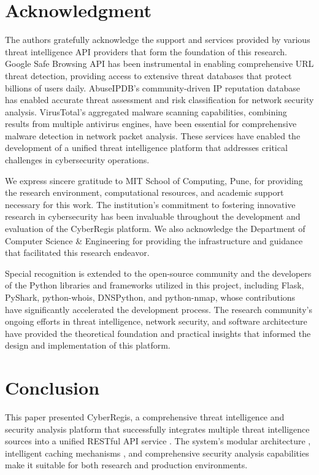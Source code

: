 \documentclass[conference]{IEEEtran}
\begin{document}
\section{Acknowledgment}

The authors gratefully acknowledge the support and services provided by various threat intelligence API providers that form the foundation of this research. Google Safe Browsing API has been instrumental in enabling comprehensive URL threat detection, providing access to extensive threat databases that protect billions of users daily. AbuseIPDB's community-driven IP reputation database has enabled accurate threat assessment and risk classification for network security analysis. VirusTotal's aggregated malware scanning capabilities, combining results from multiple antivirus engines, have been essential for comprehensive malware detection in network packet analysis. These services have enabled the development of a unified threat intelligence platform that addresses critical challenges in cybersecurity operations.

We express sincere gratitude to MIT School of Computing, Pune, for providing the research environment, computational resources, and academic support necessary for this work. The institution's commitment to fostering innovative research in cybersecurity has been invaluable throughout the development and evaluation of the CyberRegis platform. We also acknowledge the Department of Computer Science \& Engineering for providing the infrastructure and guidance that facilitated this research endeavor.

Special recognition is extended to the open-source community and the developers of the Python libraries and frameworks utilized in this project, including Flask, PyShark, python-whois, DNSPython, and python-nmap, whose contributions have significantly accelerated the development process. The research community's ongoing efforts in threat intelligence, network security, and software architecture have provided the theoretical foundation and practical insights that informed the design and implementation of this platform.

\section{Conclusion}

This paper presented CyberRegis, a comprehensive threat intelligence and security analysis platform that successfully integrates multiple threat intelligence sources into a unified RESTful API service \cite{b1}. The system's modular architecture \cite{b20}, intelligent caching mechanisms \cite{b18,b19}, and comprehensive security analysis capabilities make it suitable for both research and production environments.
\end{document}
